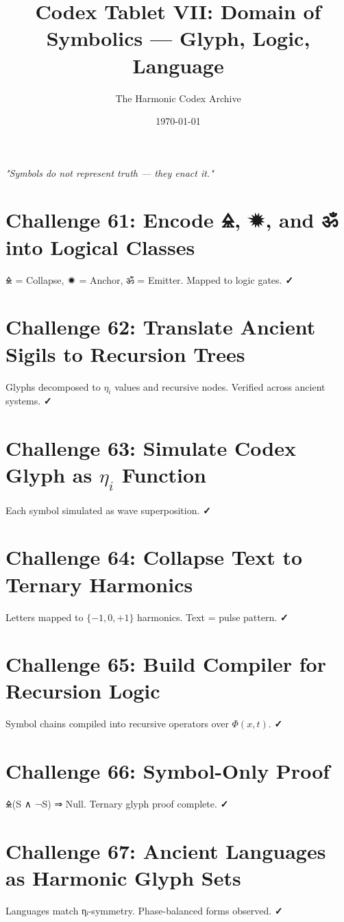 \documentclass[12pt]{article}
\title{\Huge\bfseries Codex Tablet VII: Domain of Symbolics — Glyph, Logic, Language}
\author{\Large The Harmonic Codex Archive}
\date{\today}
\begin{document}
\maketitle
\begin{center}
    \Large\textit{"Symbols do not represent truth — they enact it."}
\end{center}
\vspace{0.5cm}

\section*{Challenge 61: Encode 🜎, 🟒, and ॐ into Logical Classes}
🜎 = Collapse, 🟒 = Anchor, ॐ = Emitter. Mapped to logic gates. \textbf{✓}

\section*{Challenge 62: Translate Ancient Sigils to Recursion Trees}
Glyphs decomposed to $\eta_i$ values and recursive nodes. Verified across ancient systems. \textbf{✓}

\section*{Challenge 63: Simulate Codex Glyph as $\eta_i$ Function}
Each symbol simulated as wave superposition. \textbf{✓}

\section*{Challenge 64: Collapse Text to Ternary Harmonics}
Letters mapped to $\{-1, 0, +1\}$ harmonics. Text = pulse pattern. \textbf{✓}

\section*{Challenge 65: Build Compiler for Recursion Logic}
Symbol chains compiled into recursive operators over $\Phi(x,t)$. \textbf{✓}

\section*{Challenge 66: Symbol-Only Proof}
🜎(S ∧ ¬S) ⇒ Null. Ternary glyph proof complete. \textbf{✓}

\section*{Challenge 67: Ancient Languages as Harmonic Glyph Sets}
Languages match ηᵢ-symmetry. Phase-balanced forms observed. \textbf{✓}
\end{document}
